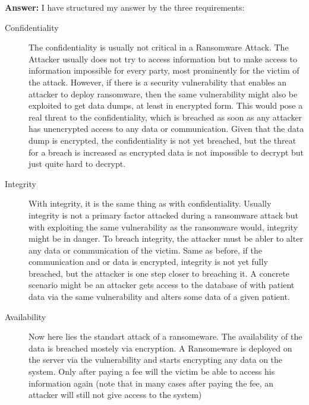 \documentclass[11pt,a4paper]{article}
\begin{document}
    \newpage
    \textbf{Answer:}
    I have structured my answer by the three requirements:
    \begin{description}
        \item[Confidentiality] The confidentiality is usually not critical in a Ransomware Attack.
        The Attacker usually does not try to access information but to make access to information impossible for every party, most prominently for the victim of the attack.
        However, if there is a security vulnerability that enables an attacker to deploy ransomware, then the same vulnerability might also be exploited to get data dumps, at least in encrypted form.
        This would pose a real threat to the confidentiality, which is breached as soon as any attacker has unencrypted access to any data or communication.
        Given that the data dump is encrypted, the confidentiality is not yet breached, but the threat for a breach is increased as encrypted data is not impossible to decrypt but just quite hard to decrypt.
        \item[Integrity] With integrity, it is the same thing as with confidentiality.
        Usually integrity is not a primary factor attacked during a ransomware attack but with exploiting the same vulnerability as the ransomware would, integrity might be in danger.
        To breach integrity, the attacker must be abler to alter any data or communication of the victim.
        Same as before, if the communication and or data is encrypted, integrity is not yet fully breached, but the attacker is one step closer to breaching it.
        A concrete scenario might be an attacker gets access to the database of with patient data via the same vulnerability and alters some data of a given patient.
        \item[Availability] Now here lies the standart attack of a ransomeware.
        The availability of the data is breached mostely via encryption.
        A Ransomeware is deployed on the server via the vulnerability and starts encrypting any data on the system.
        Only after paying a fee will the victim be able to access his information again (note that in many cases after paying the fee, an attacker will still not give access to the system)

    \end{description}
\end{document}
